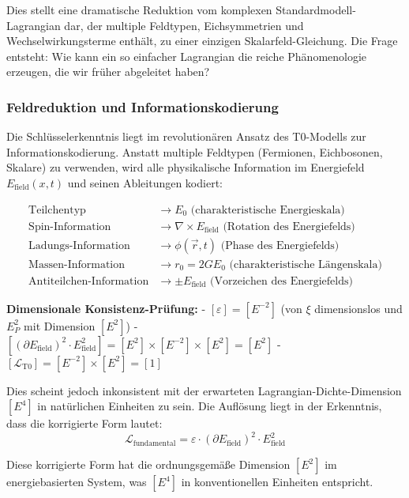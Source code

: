 \documentclass[12pt,a4paper]{article}
\newcommand{\xipar}{\xi}
\begin{document}
	Dies stellt eine dramatische Reduktion vom komplexen Standardmodell-Lagrangian dar, der multiple Feldtypen, Eichsymmetrien und Wechselwirkungsterme enthält, zu einer einzigen Skalarfeld-Gleichung. Die Frage entsteht: Wie kann ein so einfacher Lagrangian die reiche Phänomenologie erzeugen, die wir früher abgeleitet haben?
	
	\subsubsection{Feldreduktion und Informationskodierung}
	
	Die Schlüsselerkenntnis liegt im revolutionären Ansatz des T0-Modells zur Informationskodierung. Anstatt multiple Feldtypen (Fermionen, Eichbosonen, Skalare) zu verwenden, wird alle physikalische Information im Energiefeld $E_{\text{field}}(x,t)$ und seinen Ableitungen kodiert:
	
	\begin{align}
		\text{Teilchentyp} &\rightarrow E_0 \text{ (charakteristische Energieskala)} \\
		\text{Spin-Information} &\rightarrow \nabla \times E_{\text{field}} \text{ (Rotation des Energiefelds)} \\
		\text{Ladungs-Information} &\rightarrow \phi(\vec{r}, t) \text{ (Phase des Energiefelds)} \\
		\text{Massen-Information} &\rightarrow r_0 = 2GE_0 \text{ (charakteristische Längenskala)} \\
		\text{Antiteilchen-Information} &\rightarrow \pm E_{\text{field}} \text{ (Vorzeichen des Energiefelds)}
	\end{align}
	
	\textbf{Dimensionale Konsistenz-Prüfung:}
	- $[\varepsilon] = [E^{-2}]$ (von $\xipar$ dimensionslos und $E_P^2$ mit Dimension $[E^2]$)
	- $[(\partial E_{\text{field}})^2 \cdot E_{\text{field}}^2] = [E^2] \times [E^{-2}] \times [E^2] = [E^2]$
	- $[\mathcal{L}_{\text{T0}}] = [E^{-2}] \times [E^2] = [1]$
	
	Dies scheint jedoch inkonsistent mit der erwarteten Lagrangian-Dichte-Dimension $[E^4]$ in natürlichen Einheiten zu sein. Die Auflösung liegt in der Erkenntnis, dass die korrigierte Form lautet:
	\begin{equation}
		\mathcal{L}_{\text{fundamental}} = \varepsilon \cdot (\partial E_{\text{field}})^2 \cdot E_{\text{field}}^2
	\end{equation}
	
	Diese korrigierte Form hat die ordnungsgemäße Dimension $[E^2]$ im energiebasierten System, was $[E^4]$ in konventionellen Einheiten entspricht.
	
\end{document}
